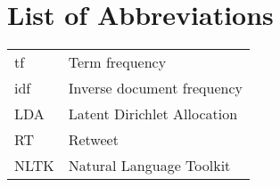 \documentclass[11pt,twoside,a4paper]{book}
\begin{document}
\chapter{List of Abbreviations}
\begin{table}[htbp]
	\begin{tabular}{>{\raggedright\arraybackslash}m{5cm}m{11cm}}
					 tf  				 & Term frequency \\
					 idf         & Inverse document frequency \\
                     LDA         & Latent Dirichlet Allocation \\
					 RT         & Retweet \\
                     NLTK         & Natural Language Toolkit \\
	\end{tabular}
\end{table}

\end{document}

